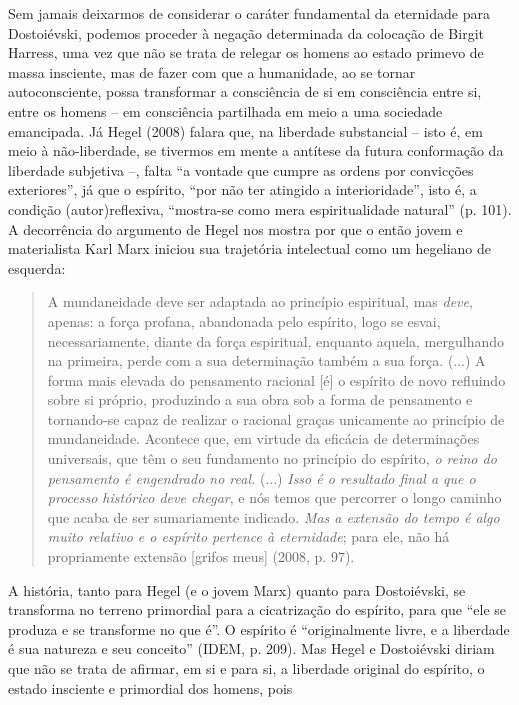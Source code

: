 Sem jamais deixarmos de considerar o caráter fundamental da eternidade
para Dostoiévski, podemos proceder à negação determinada da colocação de
Birgit Harress, uma vez que não se trata de relegar os homens ao estado
primevo de massa insciente, mas de fazer com que a humanidade, ao se
tornar autoconsciente, possa transformar a consciência de si em
consciência entre si, entre os homens -- em consciência partilhada em
meio a uma sociedade emancipada. Já Hegel (2008) falara que, na
liberdade substancial -- isto é, em meio à não-liberdade, se tivermos em
mente a antítese da futura conformação da liberdade subjetiva --, falta
``a vontade que cumpre as ordens por convicções exteriores'', já que o
espírito, ``por não ter atingido a interioridade'', isto é, a condição
(autor)reflexiva, ``mostra-se como mera espiritualidade natural'' (p.
101). A decorrência do argumento de Hegel nos mostra por que o então
jovem e materialista Karl Marx iniciou sua trajetória intelectual como
um hegeliano de esquerda:

\begin{quote}
A mundaneidade deve ser adaptada ao princípio espiritual, mas
\emph{deve}, apenas: a força profana, abandonada pelo espírito, logo se
esvai, necessariamente, diante da força espiritual, enquanto aquela,
mergulhando na primeira, perde com a sua determinação também a sua
força. (...) A forma mais elevada do pensamento racional {[}é{]} o
espírito de novo refluindo sobre si próprio, produzindo a sua obra sob a
forma de pensamento e tornando-se capaz de realizar o racional graças
unicamente ao princípio de mundaneidade. Acontece que, em virtude da
eficácia de determinações universais, que têm o seu fundamento no
princípio do espírito, \emph{o reino do pensamento é engendrado no
real.} (...) \emph{Isso é o resultado final a que o processo histórico
deve chegar}, e nós temos que percorrer o longo caminho que acaba de ser
sumariamente indicado. \emph{Mas a extensão do tempo é algo muito
relativo e o espírito pertence à eternidade}; para ele, não há
propriamente extensão {[}grifos meus{]} (2008, p. 97).
\end{quote}

A história, tanto para Hegel (e o jovem Marx) quanto para Dostoiévski,
se transforma no terreno primordial para a cicatrização do espírito,
para que ``ele se produza e se transforme no que é''. O espírito é
``originalmente livre, e a liberdade é sua natureza e seu conceito''
(IDEM, p. 209). Mas Hegel e Dostoiévski diriam que não se trata de
afirmar, em si e para si, a liberdade original do espírito, o estado
insciente e primordial dos homens, pois

